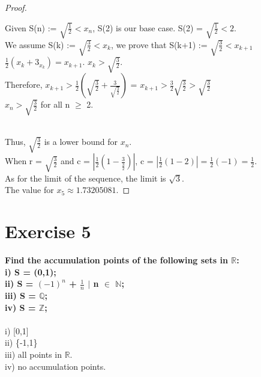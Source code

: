 \documentclass[12pt]{article}
\theoremstyle{definition}
\numberwithin{equation}{subsection}
\begin{document}
\begin{proof}
\begin{center}
Given S(n) := $\sqrt{\frac{1}{2}} < x_{n}$, S(2) is our base case. S(2) = $\sqrt{\frac{1}{2}} < 2$. 
\\ We assume S(k) := $\sqrt{\frac{3}{2}}<x_{k}$, we prove that S(k+1) := $\sqrt{\frac{3}{2}}<x_{k+1}$
\\ $\frac{1}{2}(x_{k}+3_{x_k}) = x_{k+1}$. $x_{k} > \sqrt{\frac{3}{2}}$.
\\ Therefore, $x_{k+1}>\frac{1}{2}(\sqrt{\frac{3}{2}}+\frac{3}{\sqrt{\frac{3}{2}}})$ = $x_{k+1} > \frac{3}{2}\sqrt{\frac{3}{2}}>\sqrt{\frac{3}{2}}$\\
$x_{n} > \sqrt{\frac{3}{2}}$ for all n $\geq$ 2. 
\end{center}
\\Thus, $\sqrt{\frac{3}{2}}$ is a lower bound for $x_{n}$.
\\ When r = $\sqrt{\frac{3}{2}}$ and c = $|\frac{1}{2}(1-\frac{3}{\frac{3}{2}})|$, c = $|\frac{1}{2}(1-2)| = \frac{1}{2}(-1) = \frac{1}{2}$.
\\ As for the limit of the sequence, the limit is $\sqrt{3}$.
\\ The value for $x_{5} \approx 1.73205081$.
\end{proof}
\section{Exercise 5}

\textbf{Find the accumulation points of the following sets in $\mathbb{R}$:
\\ i) S = (0,1);
\\ ii) S = {$(-1)^{n}$ + $\frac{1}{n}$ $|$ n $\in$ $\mathbb{N}$};
\\ iii) S = $\mathbb{Q}$;
\\ iv) S = $\mathbb{Z}$;
}
\\
\\ i) [0,1]
\\ ii) \{-1,1\}
\\ iii) all points in $\mathbb{R}$.
\\ iv) no accumulation points.
\end{document}

